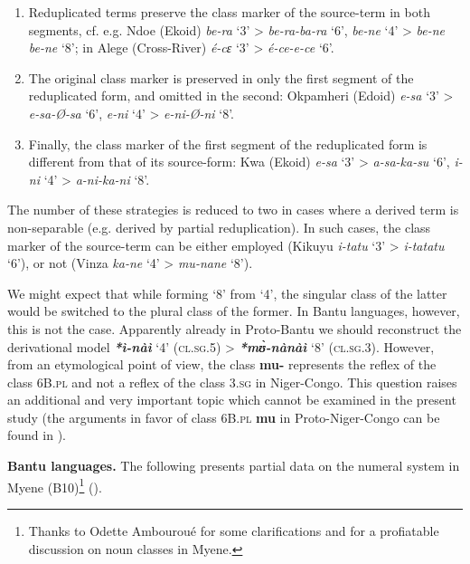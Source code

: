\begin{enumerate}
\item Reduplicated terms preserve the class marker of the source-term in both segments, cf. e.g. Ndoe (Ekoid) \textit{be-ra} ‘3’ > \textit{be-ra-ba-ra} ‘6’, \textit{be-ne} ‘4’ > \textit{be-ne} \textit{be-ne} ‘8’; in Alege (Cross-River) \textit{{\'{e}}-cɛ} ‘3’ > \textit{{\'{e}}-ce-e-ce} `6'.
\item The original class marker is preserved in only the first segment of the reduplicated form, and omitted in the second: Okpamheri (Edoid) \textit{e-sa} ‘3’ > \textit{e-sa-Ø-sa} ‘6’, \textit{e-ni} ‘4’ > \textit{e-ni-Ø-ni} ‘8’.
\item Finally, the class marker of the first segment of the reduplicated form is different from that of its source-form: Kwa (Ekoid) \textit{e-sa} ‘3’ > \textit{a-sa-ka-su} ‘6’, \textit{i-ni} ‘4’ > \textit{a-ni-ka-ni} ‘8’.
\end{enumerate}
The number of these strategies is reduced to two in cases where a derived term is non-separable (e.g. derived by partial reduplication). In such cases, the class marker of the source-term can be either employed (Kikuyu \textit{i-tatu} ‘3’  >  \textit{i-tatatu} ‘6’), or not (Vinza \textit{ka-}\textit{ne} ‘4’ > \textit{mu-}\textit{nane} ‘8’). 

We might expect that while forming ‘8’ from ‘4’, the singular class of the latter would be switched to the plural class of the former. In Bantu languages, however, this is not the case. Apparently already in Proto-Bantu we should reconstruct the derivational model  \textbf{\textit{*ì-nàì}} ‘4’ (\textsc{cl}.\textsc{sg}.5) > \textbf{\textit{*m{\`{ʊ}}-nànàì}} ‘8’ (\textsc{cl}.\textsc{sg}.3). However, from an etymological point of view, the class \textbf{mu-} represents the reflex of the class 6B.\textsc{pl} and not a reflex of the class 3.\textsc{sg} in Niger-Congo. This question raises an additional and very important topic which cannot be examined in the present study (the arguments in favor of class 6B.\textsc{pl}  \textbf{mu} in Proto-Niger-Congo can be found in \citealt{Pozdniakov2013}). 

\textbf{Bantu languages.} The following presents partial data on the numeral system in Myene (B10)\footnote{Thanks to Odette Ambouroué for some clarifications and for a profiatable discussion on noun classes in Myene.} ().



